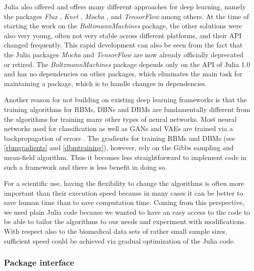 \documentclass[12pt]{article}
\newcommand{\apkg}[1]{\emph{#1}}
\begin{document}
Julia also offered and offers many different approaches for deep learning, namely the packages \apkg{Flux} \citep{flux}, \apkg{Knet} \citep{knetjl}, \apkg{Mocha} \citep{mochajl}, and \apkg{TensorFlow} \citep{tensorflowjl} among others.
At the time of starting the work on the \apkg{BoltzmannMachines} package, the other solutions were also very young, often not very stable across different platforms, and their API changed frequently.
This rapid development can also be seen from the fact that the Julia packages \apkg{Mocha} and \apkg{TensorFlow} are now already officially deprecated or retired.
The \apkg{BoltzmannMachines} package depends only on the API of Julia 1.0 and has no dependencies on other packages, which eliminates the main task for maintaining a package, which is to handle changes in dependencies.

Another reason for not building on existing deep learning frameworks is that the training algorithms for RBMs, DBNs and DBMs are fundamentally different from the algorithms for training many other types of neural networks.
Most neural networks used for classification as well as GANs and VAEs are trained via a backpropagation of errors \citep{backpropagation}.
The gradients for training RBMs and DBMs (see \ref{rbmgradients} and \ref{dbmtraining}), however, rely on the Gibbs sampling and mean-field algorithm.
Thus it becomes less straightforward to implement code in such a framework and there is less benefit in doing so.

For a scientific use, having the flexibility to change the algorithms is often more important than their execution speed because in many cases it can be better to save human time than to save computation time.
Coming from this perspective, we used plain Julia code because we wanted to have an easy access to the code to be able to tailor the algorithms to our needs and experiment with modifications.
With respect also to the biomedical data sets of rather small sample sizes, sufficient speed could be achieved via gradual optimization of the Julia code.



\subsubsection{Package interface}
\end{document}
